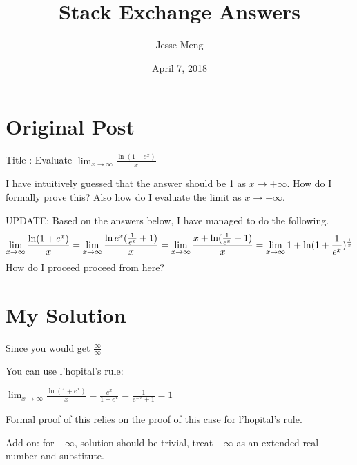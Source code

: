 \documentclass{article}
\title{Stack Exchange Answers}
\author{Jesse Meng }
\date{April 7, 2018}
\begin{document}
\maketitle

\section{Original Post}
Title : Evaluate $ \lim_{x\to\infty}\frac{\ln(1+e^x)}{x}$

I have intuitively guessed that the answer should be 1 as $x\to +\infty$. How do I formally prove this? Also how do I evaluate the limit as $x\to -\infty $.

UPDATE: Based on the answers below, I have managed to do the following.
$$
\lim_{x\to\infty} \frac{\ln (1+e^x)}{x} \\
= \lim_{x\to\infty} \frac{\ln e^x(\frac{1}{e^x}+1)}{x} \\
= \lim_{x\to\infty} \frac{x +\ln (\frac{1}{e^x}+1)}{x} \\
= \lim_{x\to\infty} 1+ \ln (1+\frac{1}{e^x})^\frac{1}{x} \\
$$
How do I proceed proceed from here?
\section{My Solution}
Since you would get $\frac{\infty}{\infty}$

You can use l'hopital's rule:

 $ \lim_{x\to\infty} \frac{\ln(1+e^x)}{x}=\frac{e^x}{1+e^x}=\frac{1}{e^{-x}+1}=1$

Formal proof of this relies on the proof of this case for l'hopital's rule.

Add on: for $-\infty$, solution should be trivial, treat $-\infty$ as an extended real number and substitute.
\end{document}

